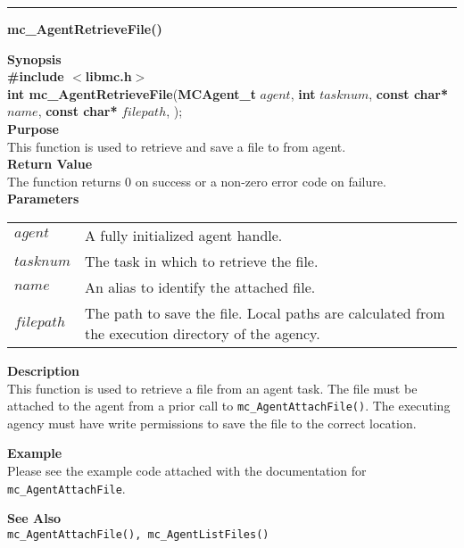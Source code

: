 \noindent
\vspace{5pt}
\rule{6.5in}{0.015in}
\noindent
{}
{\LARGE \bf mc\_AgentRetrieveFile()}\\

\noindent
{\bf Synopsis}\\
{\bf \#include $<$libmc.h$>$}\\
{\bf int mc\_AgentRetrieveFile}({\bf MCAgent\_t} $agent$, 
                                  {\bf int} $tasknum$,
                                  {\bf const char*} $name$,
                                  {\bf const char*} $filepath$,
																	);\\

\noindent
{\bf Purpose}\\
This function is used to retrieve and save a file to from agent.\\

\noindent
{\bf Return Value}\\
The function returns 0 on success or a non-zero error code on failure.\\

\noindent
{\bf Parameters}
\vspace{-0.1in}
\begin{description}
\item
\begin{tabular}{p{30 mm}p{125 mm}} 
$agent$ & A fully initialized agent handle.\\
$tasknum$ & The task in which to retrieve the file. \\
$name$ & An alias to identify the attached file.\\
$filepath$ & The path to save the file. Local paths are calculated from the
execution directory of the agency.\\
\end{tabular}
\end{description}

\noindent
{\bf Description}\\
This function is used to retrieve a file from an agent task. The file must
be attached to the agent from a prior call to \texttt{mc\_AgentAttachFile()}. 
The executing agency must have write permissions to save the file to the
correct location.

\noindent
{\bf Example}\\
\noindent
Please see the example code attached with the documentation for \texttt{mc\_AgentAttachFile}.

\noindent
{\bf See Also}\\
\texttt{mc\_AgentAttachFile(), mc\_AgentListFiles()}

